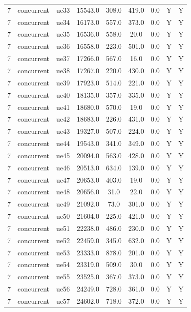 \begin{table}[ht]
\begin{tabular}{|c|c|c|c|c|c|c|c|c|}
7 & concurrent & ue33 & 15543.0 & 308.0 & 419.0 & 0.0 & Y & Y \\
7 & concurrent & ue34 & 16173.0 & 557.0 & 373.0 & 0.0 & Y & Y \\
7 & concurrent & ue35 & 16536.0 & 558.0 & 20.0 & 0.0 & Y & Y \\
7 & concurrent & ue36 & 16558.0 & 223.0 & 501.0 & 0.0 & Y & Y \\
7 & concurrent & ue37 & 17266.0 & 567.0 & 16.0 & 0.0 & Y & Y \\
7 & concurrent & ue38 & 17267.0 & 220.0 & 430.0 & 0.0 & Y & Y \\
7 & concurrent & ue39 & 17923.0 & 514.0 & 221.0 & 0.0 & Y & Y \\
7 & concurrent & ue40 & 18135.0 & 357.0 & 335.0 & 0.0 & Y & Y \\
7 & concurrent & ue41 & 18680.0 & 570.0 & 19.0 & 0.0 & Y & Y \\
7 & concurrent & ue42 & 18683.0 & 226.0 & 431.0 & 0.0 & Y & Y \\
7 & concurrent & ue43 & 19327.0 & 507.0 & 224.0 & 0.0 & Y & Y \\
7 & concurrent & ue44 & 19543.0 & 341.0 & 349.0 & 0.0 & Y & Y \\
7 & concurrent & ue45 & 20094.0 & 563.0 & 428.0 & 0.0 & Y & Y \\
7 & concurrent & ue46 & 20513.0 & 634.0 & 139.0 & 0.0 & Y & Y \\
7 & concurrent & ue47 & 20653.0 & 403.0 & 19.0 & 0.0 & Y & Y \\
7 & concurrent & ue48 & 20656.0 & 31.0 & 22.0 & 0.0 & Y & Y \\
7 & concurrent & ue49 & 21092.0 & 73.0 & 301.0 & 0.0 & Y & Y \\
7 & concurrent & ue50 & 21604.0 & 225.0 & 421.0 & 0.0 & Y & Y \\
7 & concurrent & ue51 & 22238.0 & 486.0 & 230.0 & 0.0 & Y & Y \\
7 & concurrent & ue52 & 22459.0 & 345.0 & 632.0 & 0.0 & Y & Y \\
7 & concurrent & ue53 & 23333.0 & 878.0 & 201.0 & 0.0 & Y & Y \\
7 & concurrent & ue54 & 23319.0 & 509.0 & 30.0 & 0.0 & Y & Y \\
7 & concurrent & ue55 & 23525.0 & 367.0 & 373.0 & 0.0 & Y & Y \\
7 & concurrent & ue56 & 24249.0 & 728.0 & 361.0 & 0.0 & Y & Y \\
7 & concurrent & ue57 & 24602.0 & 718.0 & 372.0 & 0.0 & Y & Y \\

\end{tabular}
\end{table}
